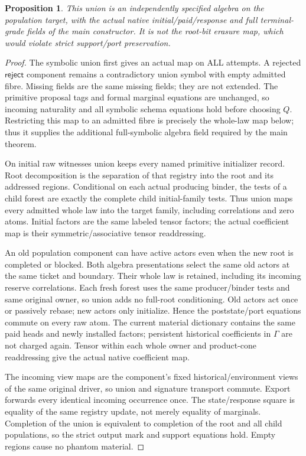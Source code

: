 \documentclass[11pt]{article}
\newtheorem{proposition}{Proposition}
\begin{document}
\begin{proposition}
This union is an independently specified algebra on the population target, with the actual native initial/paid/response and full terminal-grade fields of the main constructor. It is not the root-bit erasure map, which would violate strict support/port preservation.
\end{proposition}
\begin{proof}
The symbolic union first gives an actual map on ALL attempts. A rejected $\mathsf{reject}$ component remains a contradictory union symbol with empty admitted fibre. Missing fields are the same missing fields; they are not extended. The primitive proposal tags and formal marginal equations are unchanged, so incoming naturality and all symbolic schema equations hold before choosing $Q$. Restricting this map to an admitted fibre is precisely the whole-law map below; thus it supplies the additional full-symbolic algebra field required by the main theorem.

On initial raw witnesses union keeps every named primitive initializer record. Root decomposition is the separation of that registry into the root and its addressed regions. Conditional on each actual producing binder, the tests of a child forest are exactly the complete child initial-family tests. Thus union maps every admitted whole law into the target family, including correlations and zero atoms. Initial factors are the same labeled tensor factors; the actual coefficient map is their symmetric/associative tensor readdressing.

An old population component can have active actors even when the new root is completed or blocked. Both algebra presentations select the same old actors at the same ticket and boundary. Their whole law is retained, including its incoming reserve correlations. Each fresh forest uses the same producer/binder tests and same original owner, so union adds no full-root conditioning. Old actors act once or passively rebase; new actors only initialize. Hence the poststate/port equations commute on every raw atom. The current material dictionary contains the same paid heads and newly installed factors; persistent historical coefficients in $\Gamma$ are not charged again. Tensor within each whole owner and product-cone readdressing give the actual native coefficient map.

The incoming view maps are the component's fixed historical/environment views of the same original driver, so union and signature transport commute. Export forwards every identical incoming occurrence once. The state/response square is equality of the same registry update, not merely equality of marginals. Completion of the union is equivalent to completion of the root and all child populations, so the strict output mark and support equations hold. Empty regions cause no phantom material.


\end{proof}
\end{document}

